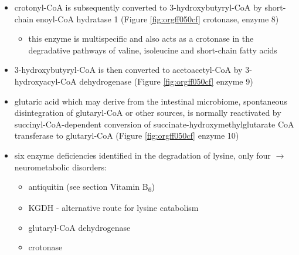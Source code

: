 \documentclass{scrartcl}
\begin{document}
\begin{itemize}
\begin{itemize}
\begin{itemize}
\end{itemize}
\end{itemize}
\item crotonyl-CoA is subsequently converted to 3-hydroxybutyryl-CoA by
short-chain enoyl-CoA hydratase 1 (Figure \ref{fig:orgff050cf} crotonase, enzyme 8)
\begin{itemize}
\item this enzyme is multispecific and also acts as a crotonase in the
degradative pathways of valine, isoleucine and short-chain fatty
acids
\end{itemize}
\item 3-hydroxybutyryl-CoA is then converted to acetoacetyl-CoA by
3-hydroxyacyl-CoA dehydrogenase (Figure \ref{fig:orgff050cf} enzyme 9)
\item glutaric acid which may derive from the intestinal microbiome,
spontaneous disintegration of glutaryl-CoA or other sources, is
normally reactivated by succinyl-CoA-dependent conversion of
succinate-hydroxymethylglutarate CoA transferase to glutaryl-CoA
(Figure \ref{fig:orgff050cf} enzyme 10)

\item six enzyme deficiencies identified in the degradation of lysine,
only four \(\to\) neurometabolic disorders:
\begin{itemize}
\item antiquitin (see section Vitamin B\textsubscript{6})
\item KGDH - alternative route for lysine catabolism
\item glutaryl-CoA dehydrogenase
\item crotonase
\end{itemize}
\end{itemize}
\end{document}

